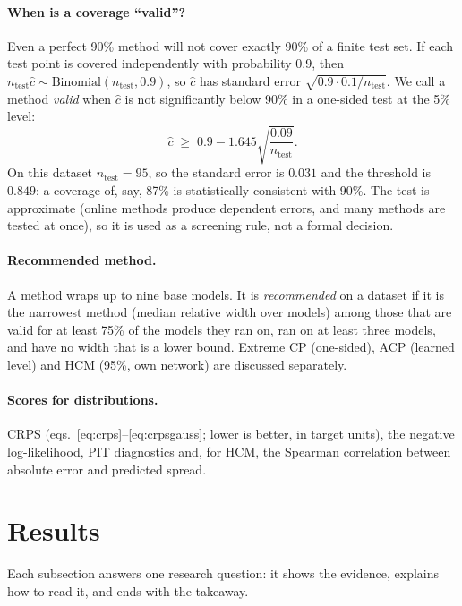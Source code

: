 \documentclass[11pt]{article}
\begin{document}
\paragraph{When is a coverage ``valid''?} Even a perfect 90\% method will not cover exactly 90\% of a finite test set. If each test
point is covered independently with probability $0.9$, then $n_{\text{test}}\hat c\sim\mathrm{Binomial}(n_{\text{test}},0.9)$, so
$\hat c$ has standard error $\sqrt{0.9\cdot0.1/n_{\text{test}}}$. We call a method \emph{valid} when $\hat c$ is not significantly
below 90\% in a one-sided test at the 5\% level:
\begin{equation}\label{eq:valid}
\hat c\;\ge\;0.9-1.645\sqrt{\frac{0.09}{n_{\text{test}}}} .
\end{equation}
On this dataset $n_{\text{test}}=95$, so the standard error is $0.031$ and the threshold is
$0.849$: a coverage of, say, 87\% is statistically consistent with 90\%.
The test is approximate (online methods produce dependent errors, and many methods are tested at once), so it is used as a
screening rule, not a formal decision.

\paragraph{Recommended method.} A method wraps up to nine base models. It is \emph{recommended} on a dataset if it is the
narrowest method (median relative width over models) among those that are valid for at least 75\% of the models they ran on,
ran on at least three models, and have no width that is a lower bound. Extreme CP (one-sided), ACP (learned level) and HCM (95\%,
own network) are discussed separately.

\paragraph{Scores for distributions.} CRPS (eqs.~\ref{eq:crps}--\ref{eq:crpsgauss}; lower is better, in target units), the negative
log-likelihood, PIT diagnostics and, for HCM, the Spearman correlation between absolute error and predicted spread.

\section{Results}\label{sec:results}
Each subsection answers one research question: it shows the evidence, explains how to read it, and ends with the takeaway.
\end{document}
